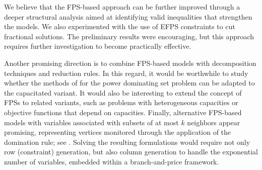 \documentclass{article}
\begin{document}
We believe that the FPS-based approach can be further improved through a deeper structural analysis aimed at identifying valid inequalities that strengthen the models.
We also experimented with the use of EFPS constraints to cut fractional solutions.
The preliminary results were encouraging, but this approach requires further investigation to become practically effective.

Another promising direction is to combine FPS-based models with decomposition techniques and reduction rules.
In this regard, it would be worthwhile to study whether the methods of \citet{Blasius2024} for the power dominating set problem can be adapted to the capacitated variant.
It would also be interesting to extend the concept of FPSs to related variants, such as problems with heterogeneous capacities or objective functions that depend on capacities.
Finally, alternative FPS-based models with variables associated with subsets of at most $k$ neighbors appear promising, representing vertices monitored through the application of the domination rule; see \citet{Korkali2009}.
Solving the resulting formulations would require not only row (constraint) generation, but also column generation to handle the exponential number of variables, embedded within a branch-and-price framework.



 

\end{document}
